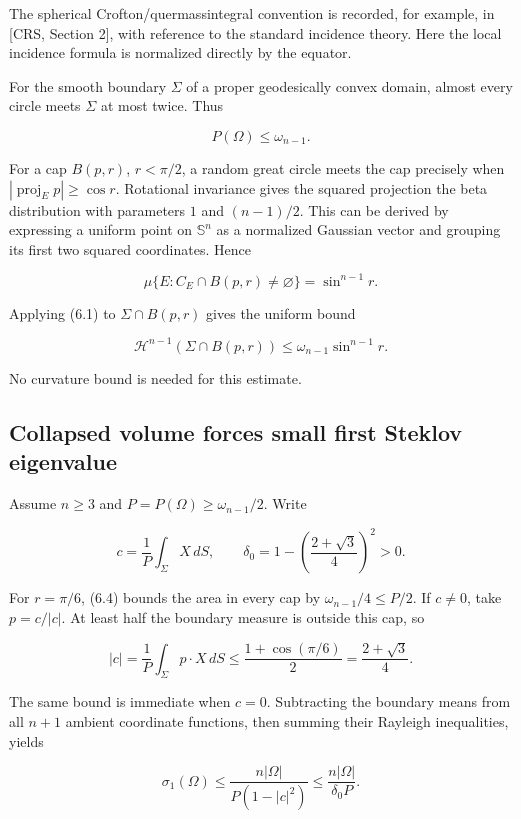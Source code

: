 \documentclass[11pt]{article}
\begin{document}
The spherical Crofton/quermassintegral convention is recorded, for
example, in {[}CRS, Section 2{]}, with reference to the standard
incidence theory. Here the local incidence formula is normalized
directly by the equator.

For the smooth boundary \(\Sigma\) of a proper geodesically convex
domain, almost every circle meets \(\Sigma\) at most twice. Thus

\[
P(\Omega)\leq\omega_{n-1}.
\tag{6.2}
\]

For a cap \(B(p,r)\), \(r<\pi/2\), a random great circle meets the cap
precisely when \(|\operatorname{proj}_E p|\geq\cos r\). Rotational
invariance gives the squared projection the beta distribution with
parameters \(1\) and \((n-1)/2\). This can be derived by expressing a
uniform point on \(\mathbb S^n\) as a normalized Gaussian vector and
grouping its first two squared coordinates. Hence

\[
\mu\{E:C_E\cap B(p,r)\ne\varnothing\}=\sin^{n-1}r.
\tag{6.3}
\]

Applying (6.1) to \(\Sigma\cap B(p,r)\) gives the uniform bound

\[
\mathcal H^{n-1}(\Sigma\cap B(p,r))
\leq\omega_{n-1}\sin^{n-1}r.
\tag{6.4}
\]

No curvature bound is needed for this estimate.

\subsection{Collapsed volume forces small first Steklov
eigenvalue}\label{collapsed-volume-forces-small-first-steklov-eigenvalue}

Assume \(n\geq3\) and \(P=P(\Omega)\geq\omega_{n-1}/2\). Write

\[
c=\frac1P\int_\Sigma X\,dS,\qquad
\delta_0=1-\left(\frac{2+\sqrt3}{4}\right)^2>0.
\tag{6.5}
\]

For \(r=\pi/6\), (6.4) bounds the area in every cap by
\(\omega_{n-1}/4\leq P/2\). If \(c\ne0\), take \(p=c/|c|\). At least
half the boundary measure is outside this cap, so

\[
|c|=\frac1P\int_\Sigma p\cdot X\,dS
\leq\frac{1+\cos(\pi/6)}2=\frac{2+\sqrt3}{4}.
\tag{6.6}
\]

The same bound is immediate when \(c=0\). Subtracting the boundary means
from all \(n+1\) ambient coordinate functions, then summing their
Rayleigh inequalities, yields

\[
\sigma_1(\Omega)
\leq\frac{n|\Omega|}{P(1-|c|^2)}
\leq\frac{n|\Omega|}{\delta_0P}.
\tag{6.7}
\]
\end{document}

